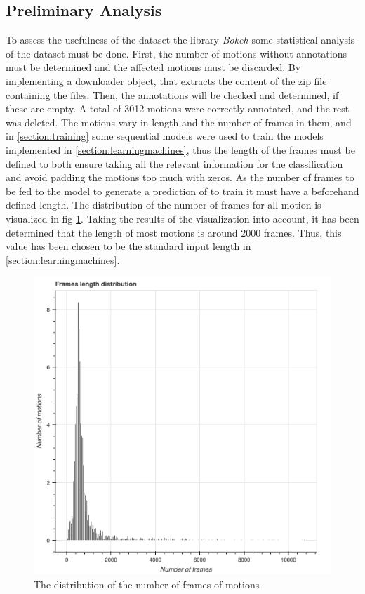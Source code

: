 		\subsection{Preliminary Analysis}\label{subsec:preliminary_analysis}
			To assess the usefulness of the dataset the library \textit{Bokeh} some statistical analysis of the dataset must be done. First, the number of motions without annotations must be determined and the affected motions must be discarded. By implementing a downloader object, that extracts the content of the zip file containing the files. Then, the annotations will be checked and determined, if these are empty. A total of 3012 motions were correctly annotated, and the rest was deleted.\newline
			The motions vary in length and the number of frames in them, and in \ref{section:training} some sequential models were used to train the models implemented in \ref{section:learningmachines}, thus the length of the frames must be defined to both ensure taking all the relevant information for the classification and avoid padding the motions too much with zeros. As the number of frames to be fed to the model to generate a prediction of to train it must have a beforehand defined length. The distribution of the number of frames for all motion is visualized in fig \ref{fig:num_frames_distro}. Taking the results of the visualization into account, it has been determined that the length of most motions is around 2000 frames. Thus, this value has been chosen to be the standard input length in \ref{section:learningmachines}.\newline
			\begin{figure}[H]
				\centering
				\includegraphics[width=.9\textwidth]{img/num-frames-distro.png}
				\caption{The distribution of the number of frames of motions}
				\label{fig:num_frames_distro}
			\end{figure}
